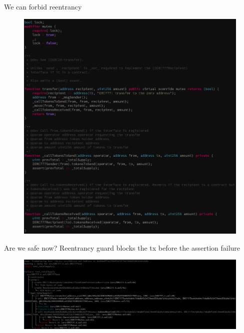 \documentclass[aspectratio=169,10pt]{beamer}
\begin{document}
\begin{frame}[fragile]
\begin{center}
We can forbid reentrancy
\begin{figure}
	\includegraphics[scale=0.25]{images/erc777_pass_mutex_smtchecker}
\end{figure}
\end{center}
\end{frame}

\begin{frame}[fragile]
\begin{center}
Are we safe now? Reentrancy guard blocks the tx before the assertion failure
\begin{figure}
	\includegraphics[scale=0.2]{images/erc777_fail_hevm_test_mutex}
\end{figure}
\end{center}
\end{frame}
\end{document}
